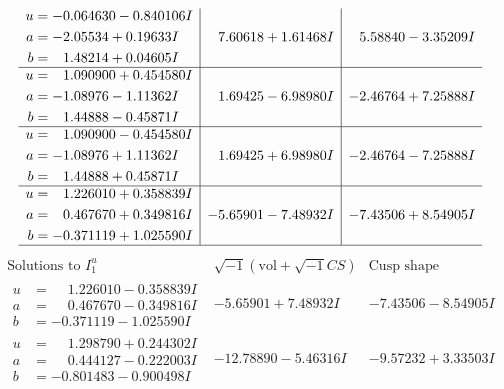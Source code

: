 \documentclass[1p]{elsarticle_modified}
\theoremstyle{definition}
\newcommand{\I}{\sqrt{-1}}
\begin{document}
$$\begin{array}{c|c|c}
\begin{aligned}
u &= -0.064630 - 0.840106 I \\
a &= -2.05534 + 0.19633 I \\
b &= \phantom{-}1.48214 + 0.04605 I\end{aligned}
 & \phantom{-}7.60618 + 1.61468 I & \phantom{-}5.58840 - 3.35209 I \\ \hline\begin{aligned}
u &= \phantom{-}1.090900 + 0.454580 I \\
a &= -1.08976 - 1.11362 I \\
b &= \phantom{-}1.44888 - 0.45871 I\end{aligned}
 & \phantom{-}1.69425 - 6.98980 I & -2.46764 + 7.25888 I \\ \hline\begin{aligned}
u &= \phantom{-}1.090900 - 0.454580 I \\
a &= -1.08976 + 1.11362 I \\
b &= \phantom{-}1.44888 + 0.45871 I\end{aligned}
 & \phantom{-}1.69425 + 6.98980 I & -2.46764 - 7.25888 I \\ \hline\begin{aligned}
u &= \phantom{-}1.226010 + 0.358839 I \\
a &= \phantom{-}0.467670 + 0.349816 I \\
b &= -0.371119 + 1.025590 I\end{aligned}
 & -5.65901 - 7.48932 I & -7.43506 + 8.54905 I\\
 \hline 
 \end{array}$$\newpage$$\begin{array}{c|c|c}  
\text{Solutions to }I^u_{1}& \I (\text{vol} + \sqrt{-1}CS) & \text{Cusp shape}\\
 \hline 
\begin{aligned}
u &= \phantom{-}1.226010 - 0.358839 I \\
a &= \phantom{-}0.467670 - 0.349816 I \\
b &= -0.371119 - 1.025590 I\end{aligned}
 & -5.65901 + 7.48932 I & -7.43506 - 8.54905 I \\ \hline\begin{aligned}
u &= \phantom{-}1.298790 + 0.244302 I \\
a &= \phantom{-}0.444127 - 0.222003 I \\
b &= -0.801483 - 0.900498 I\end{aligned}
 & -12.78890 - 5.46316 I & -9.57232 + 3.33503 I \\ \hline\begin{aligned}

\end{aligned}
\end{array}$$
\end{document}
